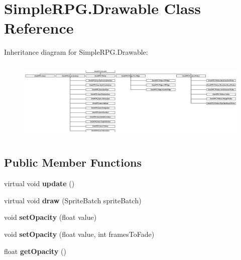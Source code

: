 \hypertarget{class_simple_r_p_g_1_1_drawable}{\section{Simple\-R\-P\-G.\-Drawable Class Reference}
\label{class_simple_r_p_g_1_1_drawable}
}
Inheritance diagram for Simple\-R\-P\-G.\-Drawable\-:\begin{figure}[H]
\begin{center}
\leavevmode
\includegraphics[height=3.902439cm]{class_simple_r_p_g_1_1_drawable}
\end{center}
\end{figure}
\subsection*{Public Member Functions}
\begin{DoxyCompactItemize}
\item 
\hypertarget{class_simple_r_p_g_1_1_drawable_a5a0bce0391462d1a6dd89f42b2db285d}{virtual void {\bfseries update} ()}\label{class_simple_r_p_g_1_1_drawable_a5a0bce0391462d1a6dd89f42b2db285d}

\item 
\hypertarget{class_simple_r_p_g_1_1_drawable_af8aa3c3839a2bba48eb04e314ebed6df}{virtual void {\bfseries draw} (Sprite\-Batch sprite\-Batch)}\label{class_simple_r_p_g_1_1_drawable_af8aa3c3839a2bba48eb04e314ebed6df}

\item 
\hypertarget{class_simple_r_p_g_1_1_drawable_a25a8469074c74391bce1d6cbf9e44c5d}{void {\bfseries set\-Opacity} (float value)}\label{class_simple_r_p_g_1_1_drawable_a25a8469074c74391bce1d6cbf9e44c5d}

\item 
\hypertarget{class_simple_r_p_g_1_1_drawable_a9210f178abf928fa27b822d73c7c0005}{void {\bfseries set\-Opacity} (float value, int frames\-To\-Fade)}\label{class_simple_r_p_g_1_1_drawable_a9210f178abf928fa27b822d73c7c0005}

\item 
\hypertarget{class_simple_r_p_g_1_1_drawable_a6c4159739e886073e9fc6567825c176e}{float {\bfseries get\-Opacity} ()}\label{class_simple_r_p_g_1_1_drawable_a6c4159739e886073e9fc6567825c176e}

\end{DoxyCompactItemize}
